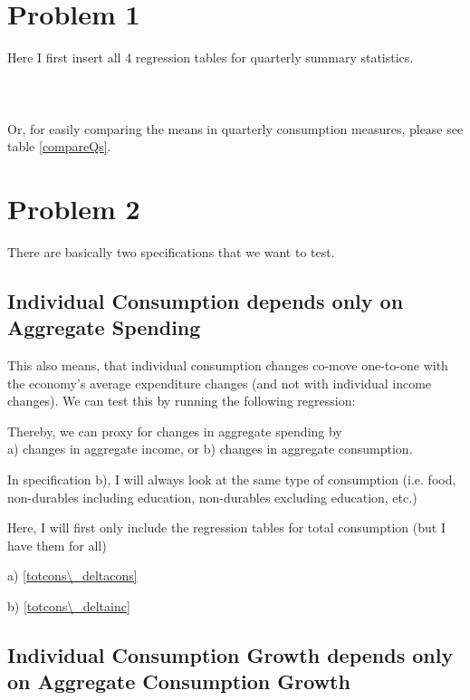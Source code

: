 \documentclass[12pt,a4paper]{article}
\begin{document}
\newpage
\section*{Problem 1}

Here I first insert all 4 regression tables for quarterly summary statistics.
\\
\\
\\
\\

Or, for easily comparing the means in quarterly consumption measures, please see table \ref{compareQs}.



\section*{Problem 2}

There are basically two specifications that we want to test. 

\subsection*{Individual Consumption depends only on Aggregate Spending}

This also means, that individual consumption changes co-move one-to-one with the economy's average expenditure changes (and not with individual income changes). We can test this by running the following regression:


Thereby, we can proxy for changes in aggregate spending by \\
a) changes in aggregate income, or
b) changes in aggregate consumption.

In specification b), I will always look at the same type of consumption (i.e. food, non-durables including education, non-durables excluding education, etc.)

Here, I will first only include the regression tables for total consumption (but I have them for all)

a) \ref{totcons\_deltacons} 

b) \ref{totcons\_deltainc}


\subsection*{Individual Consumption Growth depends only on Aggregate Consumption Growth}
\end{document}
